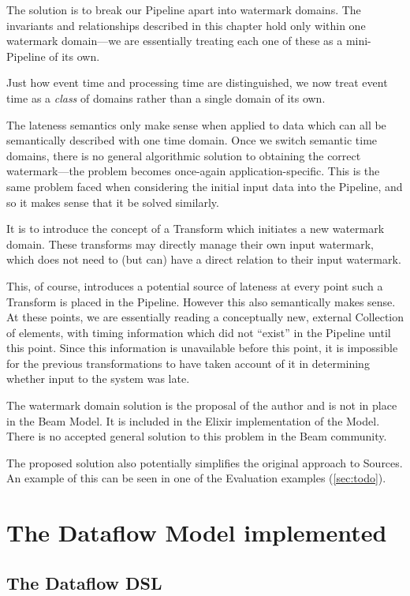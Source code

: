 The solution is to break our Pipeline apart into watermark domains.
The invariants and relationships described in this chapter hold only within one watermark domain---we are essentially treating each one of these as a mini-Pipeline of its own.

Just how event time and processing time are distinguished, we now treat event time as a \emph{class} of domains rather than a single domain of its own.

The lateness semantics only make sense when applied to data which can all be semantically described with one time domain.
Once we switch semantic time domains, there is no general algorithmic solution to obtaining the correct watermark---the problem becomes once-again application-specific.
This is the same problem faced when considering the initial input data into the Pipeline, and so it makes sense that it be solved similarly.

It is to introduce the concept of a Transform which initiates a new watermark domain.
These transforms may directly manage their own input watermark, which does not need to (but can) have a direct relation to their input watermark.

This, of course, introduces a potential source of lateness at every point such a Transform is placed in the Pipeline.
However this also semantically makes sense.
At these points, we are essentially reading a conceptually new, external Collection of elements, with timing information which did not ``exist'' in the Pipeline until this point.
Since this information is unavailable before this point, it is impossible for the previous transformations to have taken account of it in determining whether input to the system was late.

The watermark domain solution is the proposal of the author and is not in place in the Beam Model.
It is included in the Elixir implementation of the Model.
There is no accepted general solution to this problem in the Beam community.

The proposed solution also potentially simplifies the original approach to Sources.
An example of this can be seen in one of the Evaluation examples (\cref{sec:todo}).


\section{The Dataflow Model implemented}\label{sec:impl:approach}

\subsection{The Dataflow DSL}\label{sec:impl:approach:dsl}

